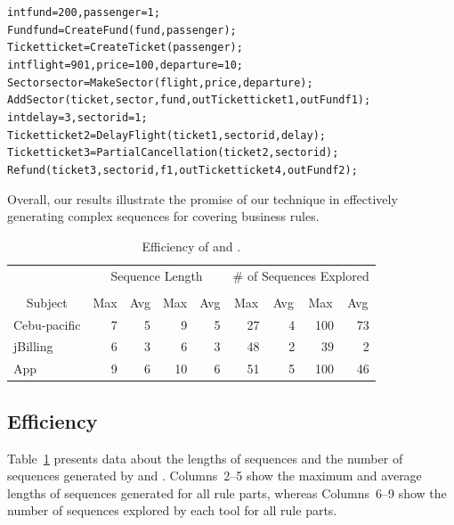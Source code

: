 {\scriptsize
\begin{alltt}
 int fund = 200, passenger = 1;
 Fund fund = CreateFund(fund, passenger);
 Ticket ticket = CreateTicket(passenger);
 int flight = 901, price = 100, departure = 10; 
 Sector sector = MakeSector(flight, price, departure);
 AddSector(ticket, sector, fund, out Ticket ticket1, out Fund f1);
 int delay = 3, sectorid = 1; 
 Ticket ticket2 = DelayFlight(ticket1, sectorid, delay);
 Ticket ticket3 = PartialCancellation(ticket2, sectorid);
 Refund(ticket3, sectorid, f1, out Ticket ticket4, out Fund f2);
\end{alltt}
}

Overall, our results illustrate the promise of our technique in effectively
generating complex sequences for covering business rules.

\begin{table}[t]
\caption{Efficiency of \tool{} and \exhaust{}.}
\centering
{\scriptsize
\tabcolsep=3pt
\begin{tabular}{|l|r|r|r|r|r|r|r|r|}
\hline
& \multicolumn{4}{|c|}{Sequence Length} & \multicolumn{4}{|c|}{\# of Sequences Explored} \\
\cline{2-9}
& \multicolumn{2}{|c|}{\tool{}} & \multicolumn{2}{|c|}{\exhaust{}} & \multicolumn{2}{|c|}{\tool{}} & \multicolumn{2}{|c|}{\exhaust{}}  \\
\cline{2-9}
\multicolumn{1}{|c|}{Subject} & \multicolumn{1}{|c|}{Max} & \multicolumn{1}{|c|}{Avg} & \multicolumn{1}{|c|}{Max} & \multicolumn{1}{|c|}{Avg} & \multicolumn{1}{|c|}{Max} & \multicolumn{1}{|c|}{Avg} & \multicolumn{1}{|c|}{Max} & \multicolumn{1}{|c|}{Avg} \\
\hline \hline
Cebu-pacific 	 &  7		& 5 &  9 &  5	 &  27 &  4	&  100 & 73 \\
jBilling		 	 &  6		& 3 &  6 &  3	 &  48 &  2	&  39  &  2 \\
App					 	 &  9		& 6 & 10 &  6	 &  51 &  5	& 100  & 46 \\
\hline
\end{tabular}
}
\label{tab:stats}
\end{table}

\subsection{Efficiency}

Table~\ref{tab:stats} presents data about the lengths of sequences and the
number of sequences generated by \tool{} and \exhaust{}. Columns~2--5 show the
maximum and average lengths of sequences generated for all rule parts, whereas
Columns~6--9 show the number of sequences explored by each tool for all rule
parts.

